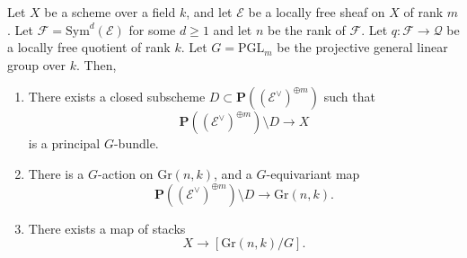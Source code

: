 \begin{lemma}
Let $X$ be a scheme over a field $k$, and let $\mathcal{E}$ be a%
locally free sheaf on $X$ of rank $m$.
Let $\mathcal{F} = \mathrm{Sym}^d(\mathcal{E})$ for some $d \geq 1$ and let $n$
be the rank of $\mathcal{F}$.
Let $q\colon \mathcal{F} \to \mathcal{Q}$ be a locally free quotient of rank $k$. 
Let $G = \mathrm{PGL}_m$ be the projective general linear group over $k$.
Then,
\begin{enumerate}
\item There exists a closed subscheme $D \subset
\mathbf{P}((\mathcal{E}^\vee)^{\oplus m})$ such that
$$
\mathbf{P}((\mathcal{E}^\vee)^{\oplus m}) \setminus D \longrightarrow X
$$
is a principal $G$-bundle.
\item There is a $G$-action on $\mathrm{Gr}(n,k)$, and 
a $G$-equivariant map
$$
\mathbf{P}((\mathcal{E}^\vee)^{\oplus m}) \setminus D \longrightarrow
\mathrm{Gr}(n,k).
$$
\item There exists a map of stacks
$$
X \longrightarrow [\mathrm{Gr}(n,k)/G].
$$
\end{enumerate}
\end{lemma}
